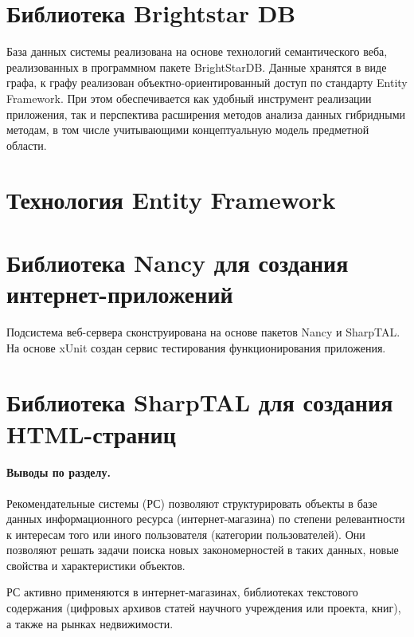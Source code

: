 \documentclass[a4paper,14pt,openany,final]{extreport} %
\begin{document}
\section{Библиотека Brightstar DB}
База данных системы реализована на основе технологий семантического веба, реализованных в программном пакете BrightStarDB. Данные хранятся в виде графа, к графу реализован объектно-ориентированный доступ по стандарту Entity Framework. При этом обеспечивается как удобный инструмент реализации приложения, так и перспектива расширения методов анализа данных гибридными методам, в том числе учитывающими концептуальную модель предметной области.
\section{Технология Entity Framework}
\section{Библиотека Nancy для создания интернет-приложений}
Подсистема веб-сервера сконструирована на основе пакетов Nancy и SharpTAL. На основе xUnit создан сервис тестирования функционирования приложения.
\section{Библиотека SharpTAL для создания HTML-страниц}

\paragraph{Выводы по разделу.}

Рекомендательные системы (РС) позволяют структурировать объекты в базе данных информационного ресурса (интернет-магазина) по степени релевантности к интересам того или иного пользователя (категории пользователей). Они позволяют решать задачи поиска новых закономерностей в таких данных, новые свойства и характеристики объектов.

РС активно применяются в интернет-магазинах, библиотеках текстового содержания (цифровых архивов статей научного учреждения или проекта, книг), а также на рынках недвижимости.
\end{document}
